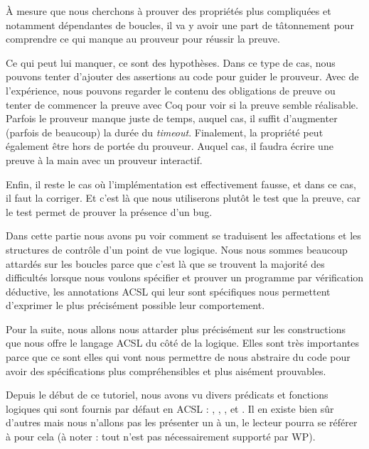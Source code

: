 \documentclass[middle]{zmdocument}
\begin{document}
À mesure que nous cherchons à prouver des propriétés plus compliquées et 
notamment dépendantes de boucles, il va y avoir une part de tâtonnement pour
comprendre ce qui manque au prouveur pour réussir la preuve.



Ce qui peut lui manquer, ce sont des hypothèses. Dans ce type de cas, nous
pouvons tenter d'ajouter des assertions au code pour guider le prouveur. Avec
de l'expérience, nous pouvons regarder le contenu des obligations de preuve ou 
tenter de commencer la preuve avec Coq pour voir si la preuve semble réalisable. 
Parfois le prouveur manque juste de temps, auquel cas, il suffit d'augmenter 
(parfois de beaucoup) la durée du \textit{timeout}. Finalement, la propriété peut 
également être hors de portée du prouveur. Auquel cas, il faudra écrire une
preuve à la main avec un prouveur interactif.



Enfin, il reste le cas où l'implémentation est effectivement fausse, et dans ce
cas, il faut la corriger. Et c'est là que nous utiliserons plutôt le test que la
preuve, car le test permet de prouver la présence d'un bug.



\horizontalLine



Dans cette partie nous avons pu voir comment se traduisent les affectations et
les structures de contrôle d'un point de vue logique. Nous nous sommes beaucoup 
attardés sur les boucles parce que c'est là que se trouvent la majorité des 
difficultés lorsque nous voulons spécifier et prouver un programme par 
vérification déductive, les annotations ACSL qui leur sont spécifiques nous 
permettent d'exprimer le plus précisément possible leur comportement.



Pour la suite, nous allons nous attarder plus précisément sur les constructions
que nous offre le langage ACSL du côté de la logique. Elles sont très 
importantes parce que ce sont elles qui vont nous permettre de nous abstraire
du code pour avoir des spécifications plus compréhensibles et plus aisément 
prouvables.





Depuis le début de ce tutoriel, nous avons vu divers prédicats et fonctions 
logiques qui sont fournis par défaut en ACSL : , ,
,  et . Il en existe bien sûr d'autres mais 
nous n'allons pas les présenter un à un, le lecteur pourra se référer à 
pour cela (à noter : tout n'est pas nécessairement supporté par WP).
\end{document}
